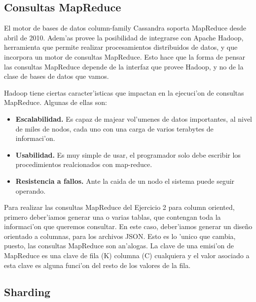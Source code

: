\subsection{Consultas MapReduce}

El motor de bases de datos column-family Cassandra soporta MapReduce desde abril de 2010. Adem'as provee la posibilidad de integrarse con Apache Hadoop, herramienta que permite realizar procesamientos distribuidos de datos, y que incorpora un motor de consultas MapReduce. Esto hace que la forma de pensar las consultas MapReduce depende de la interfaz que provee Hadoop, y no de la clase de bases de datos que vamos.

Hadoop tiene ciertas caracter'isticas que impactan en la ejecuci'on de consultas MapReduce. Algunas de ellas son:

\begin{itemize}

\item \textbf{Escalabilidad.} Es capaz de majear vol'umenes de datos importantes, al nivel de miles de nodos, cada uno con una carga de varios terabytes de informaci'on.

\item \textbf{Usabilidad.} Es muy simple de usar, el programador solo debe escribir los procedimientos realcionados con map-reduce.

\item \textbf{Resistencia a fallos.} Ante la caida de un nodo el sistema puede seguir operando.
\end{itemize}

Para realizar las consultas MapReduce del Ejercicio 2 para column oriented, primero deber'iamos generar una o varias tablas, que contengan toda la informaci'on que queremos consultar. En este caso, deber'iamos generar un dise\~no orientado a columnas, para los archivos JSON. Esto es lo 'unico que cambia, puesto, las consultas MapReduce son an'alogas. La clave de una emisi'on de MapReduce es una clave de fila (K) columna (C) cualquiera y el valor asociado a esta clave es alguna funci'on del resto de los valores de la fila.

\subsection{Sharding}
